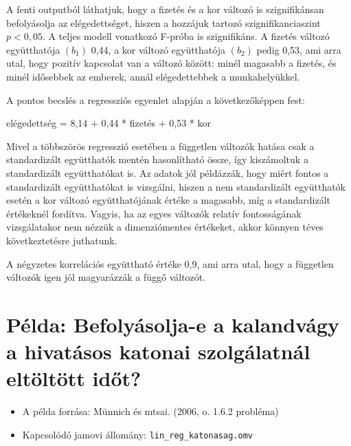 \documentclass[
  letterpaper,
]{krantz}
\makeatletter
\newenvironment{Shaded}{\begin{snugshade}}{\end{snugshade}}
\newcommand{\NormalTok}[1]{\textcolor[rgb]{0.00,0.23,0.31}{#1}}
\providecommand{\tightlist}{%
  \setlength{\itemsep}{0pt}\setlength{\parskip}{0pt}}\usepackage{longtable,booktabs,array}
\newenvironment{kframe}{%
\medskip{}
\setlength{\fboxsep}{.8em}
 \def\at@end@of@kframe{}%
 \ifinner\ifhmode%
  \def\at@end@of@kframe{\end{minipage}}%
  \begin{minipage}{\columnwidth}%
 \fi\fi%
 \def\FrameCommand##1{\hskip\@totalleftmargin \hskip-\fboxsep
 \colorbox{shadecolor}{##1}\hskip-\fboxsep
     \hskip-\linewidth \hskip-\@totalleftmargin \hskip\columnwidth}%
 \MakeFramed {\advance\hsize-\width
   \@totalleftmargin\z@ \linewidth\hsize
   \@setminipage}}%
 {\par\unskip\endMakeFramed%
 \at@end@of@kframe}
\renewenvironment{Shaded}{\begin{kframe}}{\end{kframe}}
\makeatother
\begin{document}
A fenti outputból láthatjuk, hogy a fizetés és a kor változó is
szignifikánsan befolyásolja az elégedettséget, hiszen a hozzájuk tartozó
szignifikanciaszint \(p<0,05\). A teljes modell vonatkozó F-próba is
szignifikáns. A fizetés változó együtthatója \((b_1)\) 0,44, a kor
változó együtthatója \((b_2)\) pedig 0,53, ami arra utal, hogy pozitív
kapcsolat van a változó között: minél magasabb a fizetés, és minél
idősebbek az emberek, annál elégedettebbek a munkahelyükkel.

A pontos becslés a regressziós egyenlet alapján a következőképpen fest:

\begin{Shaded}
\begin{Highlighting}[]
\NormalTok{elégedettség = 8,14 + 0,44 * fizetés + 0,53 * kor}
\end{Highlighting}
\end{Shaded}

Mivel a többszörös regresszió esetében a független változók hatása csak
a standardizált együtthatók mentén hasonlítható össze, így kiszámoltuk a
standardizált együtthatókat is. Az adatok jól példázzák, hogy miért
fontos a standardizált együtthatókat is vizsgálni, hiszen a nem
standardizált együtthatók esetén a kor változó együtthatójának értéke a
magasabb, míg a standardizált értékeknél fordítva. Vagyis, ha az egyes
változók relatív fontosságának vizsgálatakor nem nézzük a dimenziómentes
értékeket, akkor könnyen téves következtetésre juthatunk.

A négyzetes korrelációs együttható értéke 0,9, ami arra utal, hogy a
független változók igen jól magyarázzák a függő változót.

\hypertarget{puxe9lda-befolyuxe1solja-e-a-kalandvuxe1gy-a-hivatuxe1sos-katonai-szolguxe1latnuxe1l-eltuxf6ltuxf6tt-idux151t}{%
\section{Példa: Befolyásolja-e a kalandvágy a hivatásos katonai
szolgálatnál eltöltött
időt?}\label{puxe9lda-befolyuxe1solja-e-a-kalandvuxe1gy-a-hivatuxe1sos-katonai-szolguxe1latnuxe1l-eltuxf6ltuxf6tt-idux151t}}

\begin{itemize}
\tightlist
\item
  A példa forrása: Münnich és mtsai. (2006, o. 1.6.2 probléma)
\item
  Kapcsolódó jamovi állomány: \texttt{lin\_reg\_katonasag.omv}
\end{itemize}
\end{document}
